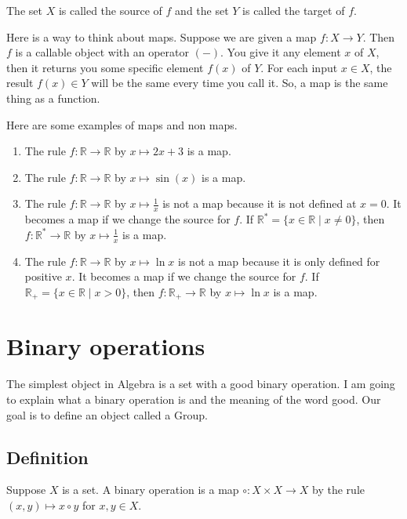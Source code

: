 The set $X$ is called the source of $f$ and the set $Y$ is called the target of $f$.

Here is a way to think about maps.
Suppose we are given a map $f\colon X\to Y$.
Then $f$ is a callable object with an operator $({-})$.
You give it any element $x$ of $X$, then it returns you some specific element $f(x)$ of $Y$.
For each input $x\in X$, the result $f(x)\in Y$ will be the same every time you call it.
So, a map is the same thing as a function.

\begin{examples}
Here are some examples of maps and non maps.
\begin{enumerate}
\item The rule $f\colon \mathbb R\to \mathbb R$ by $x\mapsto 2 x + 3$ is a map.

\item The rule $f\colon \mathbb R\to \mathbb R$ by $x\mapsto \sin(x)$ is a map.

\item The rule $f\colon \mathbb R\to \mathbb R$ by $x\mapsto \frac{1}{x}$ is not a map because it is not defined at $x = 0$.
It becomes a map if we change the source for $f$.
If $\mathbb R^* = \{x\in \mathbb R\mid x \neq 0\}$, then $f\colon \mathbb R^* \to \mathbb R$ by $x\mapsto \frac{1}{x}$ is a map.

\item The rule $f\colon \mathbb R\to \mathbb R$ by $x\mapsto \ln x$ is not a map because it is only defined for positive $x$.
It becomes a map if we change the source for $f$.
If $\mathbb R_+ = \{x\in \mathbb R\mid x > 0\}$, then $f\colon \mathbb R_+ \to \mathbb R$ by $x\mapsto \ln x$ is a map.
\end{enumerate}
\end{examples}

\section{Binary operations}

The simplest object in Algebra is a set with a good binary operation.
I am going to explain what a binary operation is and the meaning of the word good.
Our goal is to define an object called a Group.

\subsection{Definition}

\begin{definition}
Suppose $X$ is a set.
A binary operation is a map $\circ\colon X\times X\to X$ by the rule $(x, y)\mapsto x\circ y$ for $x, y\in X$.
\end{definition}

